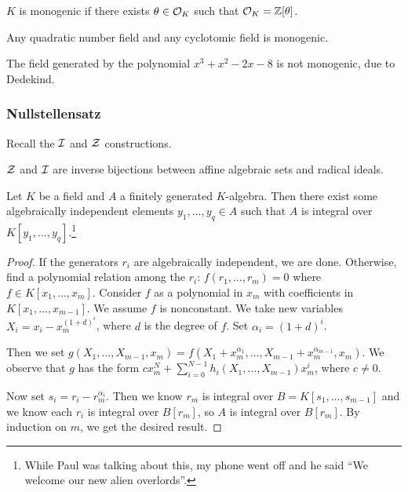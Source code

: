 \message{ !name(notes.tex)}\documentclass[10pt, twoside]{article}
\begin{document}
        \begin{defn}
            $K$ is monogenic if there exists $\theta \in \mathcal{O}_K$ such that $\mathcal{O}_K = \mathbb{Z}[\theta]$.
        \end{defn}

        \begin{exm}
            Any quadratic number field and any cyclotomic field is monogenic.
        \end{exm}
        \begin{exm}
            The field generated by the polynomial $x^3+x^2-2x-8$ is not monogenic, due to Dedekind.
        \end{exm}

        \subsubsection{Nullstellensatz}
        Recall the $\mathcal{I}$ and $\mathcal{Z}$ constructions.

        \begin{thm}
            $\mathcal{Z}$ and $\mathcal{I}$ are inverse bijections between affine algebraic sets and radical ideals.
        \end{thm}

        \begin{lem}
            Let $K$ be a field and $A$ a finitely generated $K$-algebra. Then there exist some algebraically independent elements $y_1, \ldots, y_q \in A$ such that $A$ is integral over $K[y_1, \ldots, y_q]$.\footnote{While Paul was talking about this, my phone went off and he said ``We welcome our new alien overlords''.}
            \begin{proof}
                If the generators $r_i$ are algebraically independent, we are done. Otherwise, find a polynomial relation among the $r_i$: $f(r_1, \ldots, r_m) = 0$ where $f \in K[x_1, \ldots, x_m]$. Consider $f$ as a polynomial in $x_m$ with coefficients in $K[x_1, \ldots, x_{m-1}]$. We assume $f$ is nonconstant. We take new variables $X_i = x_i-x_m^{(1+d)^i}$, where $d$ is the degree of $f$. Set $\alpha_i = (1+d)^i$.

                Then we set $g(X_1, \ldots, X_{m-1}, x_m) = f(X_1+x_m^{\alpha_1}, \ldots, X_{m-1} + x_m^{\alpha_{m-1}},x_m)$. We observe that $g$ has the form $cx_m^N + \sum_{i=0}^{N-1} h_i(X_1, \ldots, X_{m-1})x_m^i$, where $c \neq 0$.

                Now set $s_i = r_i - r_m^{\alpha_i}$. Then we know $r_m$ is integral over $B=K[s_1, \ldots, s_{m-1}]$ and we know each $r_i$ is integral over $B[r_m]$, so $A$ is integral over $B[r_m]$. By induction on $m$, we get the desired result.
            \end{proof}
        \end{lem}
\end{document}
